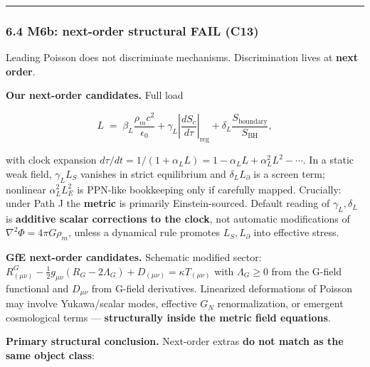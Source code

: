 \documentclass[
  11pt,
]{article}
\begin{document}
\begin{center}\rule{0.5\linewidth}{0.5pt}\end{center}

\subsubsection{\texorpdfstring{6.4 M6b: next-order structural FAIL
(\textbf{C13})}{6.4 M6b: next-order structural FAIL (C13)}}\label{m6b-next-order-structural-fail-c13}

Leading Poisson does not discriminate mechanisms. Discrimination lives
at \textbf{next order}.

\textbf{Our next-order candidates.} Full load

\[
L \;=\; \beta_L\frac{\rho_m c^2}{\epsilon_0} + \gamma_L\left|\frac{dS_c}{d\tau}\right|_{\mathrm{reg}} + \delta_L\frac{S_{\mathrm{boundary}}}{S_{\mathrm{BH}}},
\]

with clock expansion
\(d\tau/dt=1/(1+\alpha_L L)=1-\alpha_L L+\alpha_L^2 L^2-\cdots\). In a
static weak field, \(\gamma_L L_S\) vanishes in strict equilibrium and
\(\delta_L L_\partial\) is a screen term; nonlinear \(\alpha_L^2 L_E^2\)
is PPN-like bookkeeping only if carefully mapped. Crucially: under Path
J the \textbf{metric} is primarily Einstein-sourced. Default reading of
\(\gamma_L,\delta_L\) is \textbf{additive scalar corrections to the
clock}, not automatic modifications of \(\nabla^2\Phi=4\pi G\rho_m\),
unless a dynamical rule promotes \(L_S,L_\partial\) into effective
stress.

\textbf{GfE next-order candidates.} Schematic modified sector:
\(R^G_{(\mu\nu)}-\frac12 g_{\mu\nu}(R_G-2\Lambda_G)+D_{(\mu\nu)}=\kappa T_{(\mu\nu)}\)
with \(\Lambda_G\ge 0\) from the G-field functional and \(D_{\mu\nu}\)
from G-field derivatives. Linearized deformations of Poisson may involve
Yukawa/scalar modes, effective \(G_N\) renormalization, or emergent
cosmological terms --- \textbf{structurally inside the metric field
equations}.

\textbf{Primary structural conclusion.} Next-order extras \textbf{do not
match as the same object class}:
\end{document}
